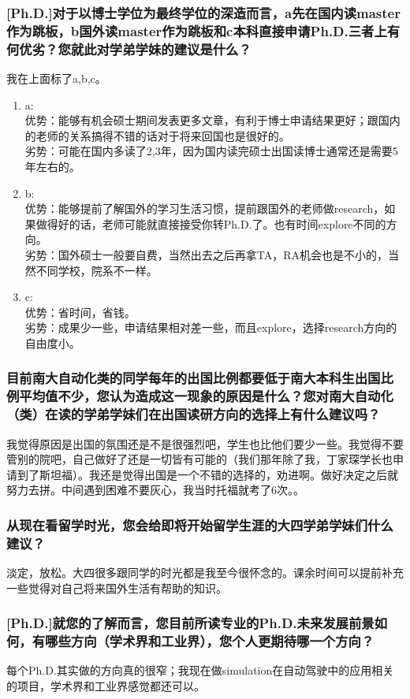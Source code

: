 \documentclass[a4paper,UTF8]{book}
\begin{document}
    \subsubsection*{[Ph.D.]对于以博士学位为最终学位的深造而言，a先在国内读master作为跳板，b国外读master作为跳板和c本科直接申请Ph.D.三者上有何优劣？您就此对学弟学妹的建议是什么？}
        我在上面标了a,b,c。
        \begin{enumerate}[itemindent=0pt,itemsep=0pt,parsep=0pt]
        \item a:\\
        优势：能够有机会硕士期间发表更多文章，有利于博士申请结果更好；跟国内的老师的关系搞得不错的话对于将来回国也是很好的。\\
        劣势：可能在国内多读了2,3年，因为国内读完硕士出国读博士通常还是需要5年左右的。
        \item b:\\
        优势：能够提前了解国外的学习生活习惯，提前跟国外的老师做research，如果做得好的话，老师可能就直接接受你转Ph.D.了。也有时间explore不同的方向。\\
        劣势：国外硕士一般要自费，当然出去之后再拿TA，RA机会也是不小的，当然不同学校，院系不一样。
        \item c:\\
        优势：省时间，省钱。\\
        劣势：成果少一些，申请结果相对差一些，而且explore，选择research方向的自由度小。
        \end{enumerate}
    \subsubsection*{目前南大自动化类的同学每年的出国比例都要低于南大本科生出国比例平均值不少，您认为造成这一现象的原因是什么？您对南大自动化（类）在读的学弟学妹们在出国读研方向的选择上有什么建议吗？}
    我觉得原因是出国的氛围还是不是很强烈吧，学生也比他们要少一些。我觉得不要管别的院吧，自己做好了还是一切皆有可能的（我们那年除了我，丁家琛学长也申请到了斯坦福）。我还是觉得出国是一个不错的选择的，劝进啊。做好决定之后就努力去拼。中间遇到困难不要灰心，我当时托福就考了6次。。
    \subsubsection*{从现在看留学时光，您会给即将开始留学生涯的大四学弟学妹们什么建议？}
    淡定，放松。大四很多跟同学的时光都是我至今很怀念的。课余时间可以提前补充 一些觉得对自己将来国外生活有帮助的知识。
    \subsubsection*{[Ph.D.]就您的了解而言，您目前所读专业的Ph.D.未来发展前景如何，有哪些方向（学术界和工业界），您个人更期待哪一个方向？}
    每个Ph.D.其实做的方向真的很窄；我现在做simulation在自动驾驶中的应用相关的项目，学术界和工业界感觉都还可以。
\end{document}
